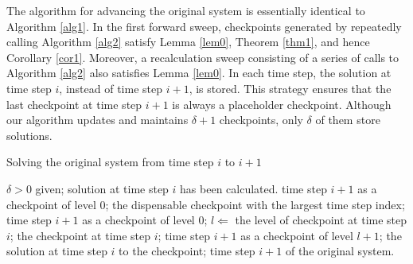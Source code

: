 The algorithm for advancing the original system is essentially identical to
Algorithm \ref{alg1}.  In the first forward sweep, checkpoints generated by
repeatedly calling Algorithm \ref{alg2} satisfy Lemma \ref{lem0},
Theorem \ref{thm1}, and hence Corollary \ref{cor1}.  Moreover, a recalculation
sweep consisting of a series of calls to Algorithm \ref{alg2} also satisfies
Lemma \ref{lem0}.  In each time step, the solution at time step $i$, instead
of time step $i + 1$, is stored.  This strategy ensures that the last
checkpoint at time step $i + 1$ is always a placeholder checkpoint.  Although
our algorithm updates and maintains $\delta + 1$ checkpoints, only $\delta$ of
them store solutions.
\begin{algorithm}
\caption{Solving the original system from time step $i$ to $i + 1$}
\label{alg2}
\begin{algorithmic}[indent=3em]
    \REQUIRE $\delta > 0$ given; solution at time step $i$ has been calculated.
         time step $i + 1$ as a checkpoint of level 0;
         the dispensable checkpoint with the largest time
               step index;
         time step $i + 1$ as a checkpoint of level 0;
    \ELSE
        \STATE $l \Leftarrow$ the level of checkpoint at time step $i$;
         the checkpoint at time step $i$;
         time step $i + 1$ as a checkpoint of level
               $l + 1$;
    \ENDIF
         the solution at time step $i$ to the checkpoint;
    \ENDIF
     time step $i + 1$ of the original system.
\end{algorithmic}
\end{algorithm}

